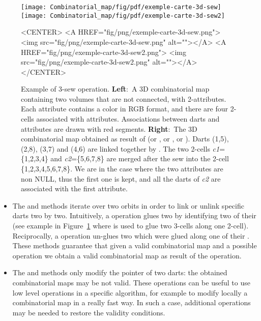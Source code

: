 \def\LargFig{.45\textwidth}
\begin{figure}
  \begin{ccTexOnly}
    \begin{center}
      \texttt{[image: Combinatorial\_map/fig/pdf/exemple-carte-3d-sew]}\qquad
      \texttt{[image: Combinatorial\_map/fig/pdf/exemple-carte-3d-sew2]}
    \end{center}
  \end{ccTexOnly}
  \begin{ccHtmlOnly}
    <CENTER> <A HREF="fig/png/exemple-carte-3d-sew.png"> <img
    src="fig/png/exemple-carte-3d-sew.png" alt=""></A> <A
    HREF="fig/png/exemple-carte-3d-sew2.png"> <img
    src="fig/png/exemple-carte-3d-sew2.png" alt=""></A> </CENTER>
  \end{ccHtmlOnly}
  \caption{Example of 3-sew operation. \textbf{Left}:~A 3D
    combinatorial map containing two volumes that are not connected,
    with 2-attributes. Each attribute contains a color in RGB format,
    and there are four 2-cells associated with attributes.
    Associations between darts and attributes are drawn with red
    segments. \textbf{Right}:~The 3D combinatorial map obtained as
    result of  (or , or
    , or ). Darts (1,5), (2,8),
    (3,7) and (4,6) are linked together by \betatrois{}. The two 2-cells
    \emph{c1}=\{1,2,3,4\} and \emph{c2}=\{5,6,7,8\} are merged after the sew
    into the 2-cell \{1,2,3,4,5,6,7,8\}. We are in the case where
    the two attributes are non NULL, thus the first one is kept, and
    all the darts of \emph{c2} are associated with the first attribute.}
  \label{fig-exemple-sew}
\end{figure}
\begin{itemize}
\item The  and  methods iterate over two orbits in
  order to link or unlink specific darts two by two.  Intuitively, a
   operation glues two  by identifying two of
  their  (see example in Figure~\ref{fig-exemple-sew}
  where  is used to glue two 3-cells along one 2-cell).
  Reciprocally, a  operation un-glues two  which
  were glued along one of their .
  These methods guarantee that given a valid combinatorial map and a
  possible operation we obtain a valid combinatorial map as result of
  the operation.

\item
\begin{ccAdvanced}
  The  and  methods only modify
  the pointer of two darts: the obtained combinatorial maps may be not
  valid. These operations can be useful to use low level operations
  in a specific algorithm, for example to modify locally a
  combinatorial map in a really fast way. In such a case, additional
  operations may be needed to restore the validity conditions.
\end{ccAdvanced}
\end{itemize}

